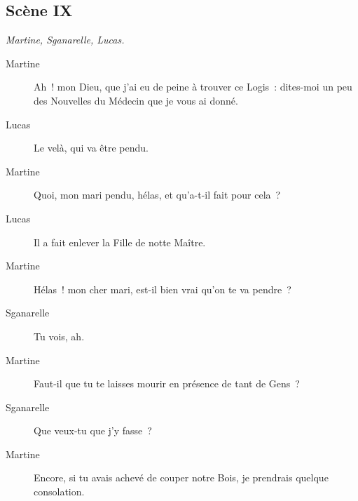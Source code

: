 \documentclass[french,twoside]{book} %
\begin{document}
\subsection[{Scène IX}]{Scène IX}
\label{III09}
\textit{Martine, Sganarelle, Lucas.}\par
 \begin{description} \item[Martine] 

Ah ! mon Dieu, que j’ai eu de peine à trouver ce Logis : dites-moi un peu des Nouvelles du Médecin que je vous ai donné.\end{description}
 \begin{description} \item[Lucas] 

Le velà, qui va être pendu.\end{description}
 \begin{description} \item[Martine] 

Quoi, mon mari pendu, hélas, et qu’a-t-il fait pour cela ?\end{description}
 \begin{description} \item[Lucas] 

Il a fait enlever la Fille de notte Maître.\end{description}
 \begin{description} \item[Martine] 

Hélas ! mon cher mari, est-il bien vrai qu’on te va pendre ?\end{description}
 \begin{description} \item[Sganarelle] 

Tu vois, ah.\end{description}
 \begin{description} \item[Martine] 

Faut-il que tu te laisses mourir en présence de tant de Gens ?\end{description}
 \begin{description} \item[Sganarelle] 

Que veux-tu que j’y fasse ?\end{description}
 \begin{description} \item[Martine] 

Encore, si tu avais achevé de couper notre Bois, je prendrais quelque consolation.\end{description}
\end{document}
